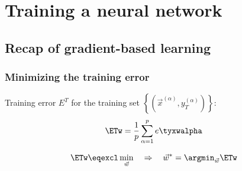 \section{Training a neural network}


\subsection{Recap of gradient-based learning}

\begin{frame}\frametitle{Minimizing the training error}
	Training error $E^T$ for the training set $\left\{(\vec x^{(\alpha)}, y^{(\alpha)}_{T})\right\}$: 
    \begin{equation}
        \ETw = \frac{1}{p} \sum\limits_{\alpha = 1}^p 
					e\tyxwalpha
    \end{equation}
    
    
    \begin{equation}
        \ETw \eqexcl \min_{\vec w} \quad \Rightarrow \quad \vec w^{*} = \argmin_{\vec w} \ETw
    \end{equation}
    
\end{frame}

